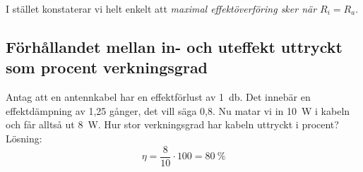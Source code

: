 I stället konstaterar vi helt enkelt att \emph{maximal effektöverföring sker när
\(R_i = R_a\)}.

\subsection{Förhållandet mellan in- och uteffekt uttryckt som procent verkningsgrad}
\label{verkningsgrad}

Antag att en antennkabel har en effektförlust av \qty{1}{\decibel}.
Det innebär en effektdämpning av 1,25 gånger, det vill säga 0,8.
Nu matar vi in \qty{10}{\watt} i kabeln och får alltså ut \qty{8}{\watt}.
Hur stor verkningsgrad har kabeln uttryckt i procent?
Lösning:
\[\eta = \dfrac{8}{10} \cdot 100 = 80\ \%\]
